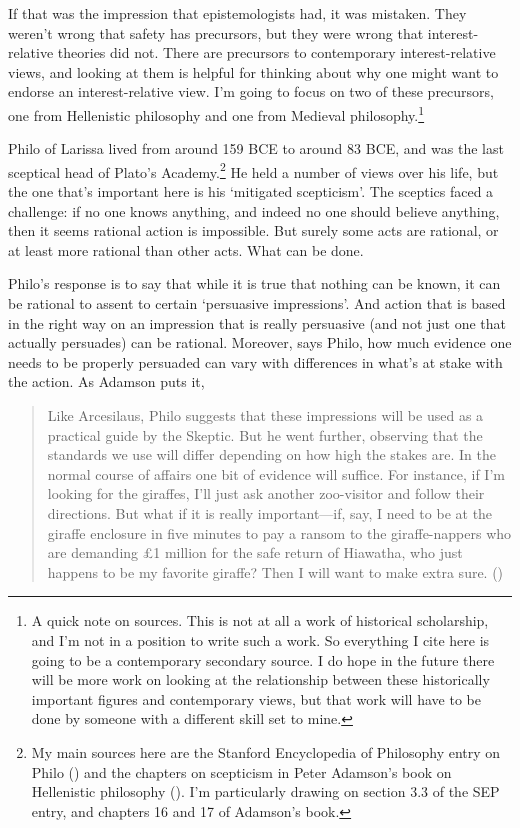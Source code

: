 \documentclass[
  12pt,
  letterpaper,
]{scrbook}
\begin{document}
If that was the impression that epistemologists had, it was mistaken.
They weren't wrong that safety has precursors, but they were wrong that
interest-relative theories did not. There are precursors to contemporary
interest-relative views, and looking at them is helpful for thinking
about why one might want to endorse an interest-relative view. I'm going
to focus on two of these precursors, one from Hellenistic philosophy and
one from Medieval philosophy.\footnote{A quick note on sources. This is
  not at all a work of historical scholarship, and I'm not in a position
  to write such a work. So everything I cite here is going to be a
  contemporary secondary source. I do hope in the future there will be
  more work on looking at the relationship between these historically
  important figures and contemporary views, but that work will have to
  be done by someone with a different skill set to mine.}

Philo of Larissa lived from around 159 BCE to around 83 BCE, and was the
last sceptical head of Plato's Academy.\footnote{My main sources here
  are the Stanford Encyclopedia of Philosophy entry on Philo
  () and the
  chapters on scepticism in Peter Adamson's book on Hellenistic
  philosophy (). I'm
  particularly drawing on section 3.3 of the SEP entry, and chapters 16
  and 17 of Adamson's book.} He held a number of views over his life,
but the one that's important here is his `mitigated scepticism'. The
sceptics faced a challenge: if no one knows anything, and indeed no one
should believe anything, then it seems rational action is impossible.
But surely some acts are rational, or at least more rational than other
acts. What can be done.

Philo's response is to say that while it is true that nothing can be
known, it can be rational to assent to certain `persuasive impressions'.
And action that is based in the right way on an impression that is
really persuasive (and not just one that actually persuades) can be
rational. Moreover, says Philo, how much evidence one needs to be
properly persuaded can vary with differences in what's at stake with the
action. As Adamson puts it,

\begin{quote}
Like Arcesilaus, Philo suggests that these impressions will be used as a
practical guide by the Skeptic. But he went further, observing that the
standards we use will differ depending on how high the stakes are. In
the normal course of affairs one bit of evidence will suffice. For
instance, if I'm looking for the giraffes, I'll just ask another
zoo-visitor and follow their directions. But what if it is really
important---if, say, I need to be at the giraffe enclosure in five
minutes to pay a ransom to the giraffe-nappers who are demanding £1
million for the safe return of Hiawatha, who just happens to be my
favorite giraffe? Then I will want to make extra sure.
()
\end{quote}
\end{document}
